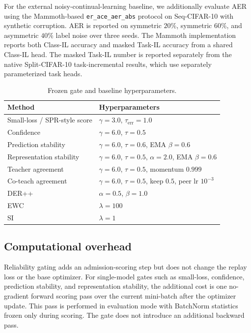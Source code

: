 \documentclass[preprint,12pt]{elsarticle}
\begin{document}
For the external noisy-continual-learning baseline, we additionally evaluate AER using the Mammoth-based \texttt{er\_ace\_aer\_abs} protocol on Seq-CIFAR-10 with synthetic corruption. AER is reported on symmetric $20\%$, symmetric $60\%$, and asymmetric $40\%$ label noise over three seeds. The Mammoth implementation reports both Class-IL accuracy and masked Task-IL accuracy from a shared Class-IL head. The masked Task-IL number is reported separately from the native Split-CIFAR-10 task-incremental results, which use separately parameterized task heads.

\begin{table}[H]
\centering
\caption{Frozen gate and baseline hyperparameters.}
\label{tab:hparams}
\small
\begin{tabular}{ll}
\toprule
Method & Hyperparameters \\
\midrule
Small-loss / SPR-style score & $\gamma=3.0$, $\tau_{\mathrm{err}}=1.0$ \\
Confidence & $\gamma=6.0$, $\tau=0.5$ \\
Prediction stability & $\gamma=6.0$, $\tau=0.6$, EMA $\beta=0.6$ \\
Representation stability & $\gamma=6.0$, $\tau=0.5$, $\alpha=2.0$, EMA $\beta=0.6$ \\
Teacher agreement & $\gamma=6.0$, $\tau=0.5$, momentum $0.999$ \\
Co-teach agreement & $\gamma=6.0$, $\tau=0.5$, keep $0.5$, peer lr $10^{-3}$ \\
DER++ & $\alpha=0.5$, $\beta=1.0$ \\
EWC & $\lambda=100$ \\
SI & $\lambda=1$ \\
\bottomrule
\end{tabular}
\end{table}

\subsection{Computational overhead}

Reliability gating adds an admission-scoring step but does not change the replay loss or the base optimizer. For single-model gates such as small-loss, confidence, prediction stability, and representation stability, the additional cost is one no-gradient forward scoring pass over the current mini-batch after the optimizer update. This pass is performed in evaluation mode with BatchNorm statistics frozen only during scoring. The gate does not introduce an additional backward pass.
\end{document}
